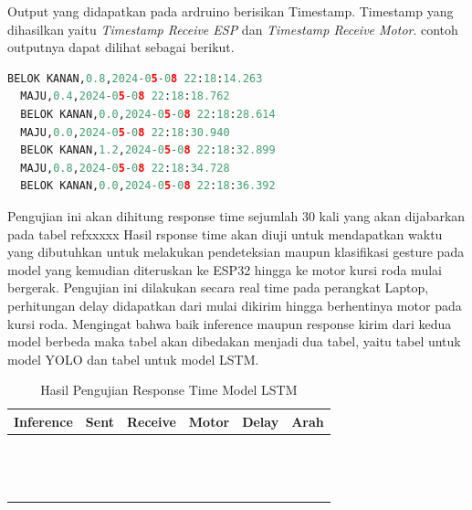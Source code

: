 \newpage
Output yang didapatkan pada ardruino berisikan Timestamp. Timestamp yang dihasilkan yaitu \emph{Timestamp Receive ESP} dan \emph{Timestamp Receive Motor}. contoh outputnya dapat dilihat sebagai berikut.

\begin{lstlisting}[language=python]
  BELOK KANAN,0.8,2024-05-08 22:18:14.263
  MAJU,0.4,2024-05-08 22:18:18.762
  BELOK KANAN,0.0,2024-05-08 22:18:28.614
  MAJU,0.0,2024-05-08 22:18:30.940
  BELOK KANAN,1.2,2024-05-08 22:18:32.899
  MAJU,0.8,2024-05-08 22:18:34.728
  BELOK KANAN,0.0,2024-05-08 22:18:36.392
\end{lstlisting}

Pengujian ini akan dihitung response time sejumlah 30 kali yang akan dijabarkan pada tabel refxxxxx Hasil rsponse time akan diuji untuk mendapatkan waktu yang dibutuhkan untuk melakukan pendeteksian maupun klasifikasi gesture pada model yang kemudian diteruskan ke ESP32 hingga ke motor kursi roda mulai bergerak. Pengujian ini dilakukan secara real time pada perangkat Laptop, perhitungan delay didapatkan dari mulai dikirim hingga berhentinya motor pada kursi roda. Mengingat bahwa baik inference maupun response kirim dari kedua model berbeda maka tabel akan dibedakan menjadi dua tabel, yaitu tabel untuk model YOLO dan tabel untuk model LSTM.

\begin{table}[H]
  \centering
  \label{tb:TabelHasilPengujianResponseTimeLSTM}
  \caption{Hasil Pengujian Response Time Model LSTM}
  \begin{tabular}{|l|l|l|l|l|l|}
  \hline
  Inference & Sent & Receive & Motor & Delay & Arah \\ \hline
            &      &         &       &       &      \\ \hline
            &      &         &       &       &      \\ \hline
            &      &         &       &       &      \\ \hline
            &      &         &       &       &      \\ \hline
            &      &         &       &       &      \\ \hline
            &      &         &       &       &      \\ \hline
            &      &         &       &       &      \\ \hline
            &      &         &       &       &      \\ \hline
            &      &         &       &       &      \\ \hline
            &      &         &       &       &      \\ \hline
            &      &         &       &       &      \\ \hline
            &      &         &       &       &      \\ \hline
            &      &         &       &       &      \\ \hline
            &      &         &       &       &      \\ \hline
  \end{tabular}
  \end{table}

